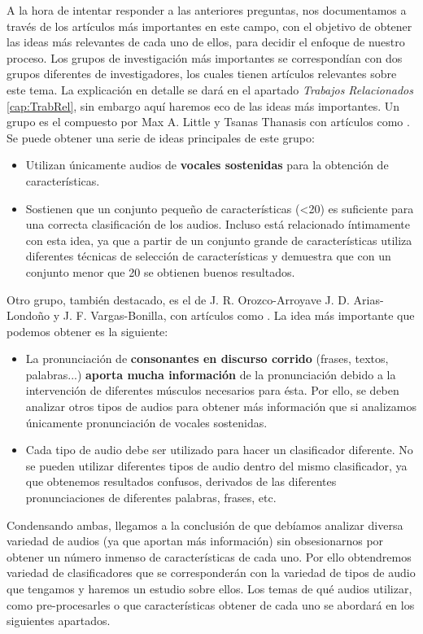 A la hora de intentar responder a las anteriores preguntas, nos documentamos a través de los artículos más importantes en este campo, con el objetivo de obtener las ideas más relevantes de cada uno de ellos, para decidir el enfoque de nuestro proceso. Los grupos de investigación más importantes se correspondían con dos grupos diferentes de investigadores, los cuales tienen artículos relevantes sobre este tema. La explicación en detalle se dará en el apartado \textit{Trabajos Relacionados} \ref{cap:TrabRel}, sin embargo aquí haremos eco de las ideas más importantes.
Un grupo es el compuesto por Max A. Little y Tsanas Thanasis con artículos como \cite{MxLtSuitability}. Se puede obtener una serie de ideas principales de este grupo:
\begin{itemize}
\item Utilizan únicamente audios de \textbf{vocales sostenidas} para la obtención de características.
\item Sostienen que un conjunto pequeño de características (<20) es suficiente para una correcta clasificación de los audios. Incluso \cite{MxLtNovel} está relacionado íntimamente con esta idea, ya que a partir de un conjunto grande de características utiliza diferentes técnicas de selección de características y demuestra que con un conjunto menor que 20 se obtienen buenos resultados.
\end{itemize}

Otro grupo, también destacado, es el de J. R. Orozco-Arroyave J. D. Arias-Londoño y J. F. Vargas-Bonilla, con artículos como \cite{Orz2016}. La idea más importante que podemos obtener es la siguiente:
\begin{itemize}
\item La pronunciación de \textbf{consonantes en discurso corrido} (frases, textos, palabras...) \textbf{aporta mucha información} de la pronunciación debido a la intervención de diferentes músculos necesarios para ésta. Por ello, se deben analizar otros tipos de audios para obtener más información que si analizamos únicamente pronunciación de vocales sostenidas.
\item Cada tipo de audio debe ser utilizado para hacer un clasificador diferente. No se pueden utilizar diferentes tipos de audio dentro del mismo clasificador, ya que obtenemos resultados confusos, derivados de las diferentes pronunciaciones de diferentes palabras, frases, etc.
\end{itemize}


\begin{tcolorbox}
Condensando ambas, llegamos a la conclusión de que debíamos analizar diversa variedad de audios (ya que aportan más información) sin obsesionarnos por obtener un número inmenso de características de cada uno. Por ello obtendremos variedad de clasificadores que se corresponderán con la variedad de tipos de audio que tengamos y haremos un estudio sobre ellos. Los temas de qué audios utilizar, como pre-procesarles o que características obtener de cada uno se abordará en los siguientes apartados.
\end{tcolorbox}


